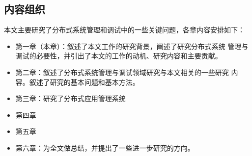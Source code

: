 \subsection{内容组织}

本文主要研究了分布式系统管理和调试中的一些关键问题，各章内容安排如下：

\begin{itemize}

  \item 第一章（本章）：叙述了本文工作的研究背景，阐述了研究分布式系统
  管理与调试的必要性，并引出了本文的工作的动机、研究内容和主要贡献。

  \item 第二章：叙述了分布式系统管理与调试领域研究与本文相关的一些研究
  内容。叙述了研究的基本问题和基本方法。

  \item 第三章：研究了分布式应用管理系统

  \item 第四章

  \item 第五章

  \item 第六章：为全文做总结，并提出了一些进一步研究的方向。

\end{itemize}

